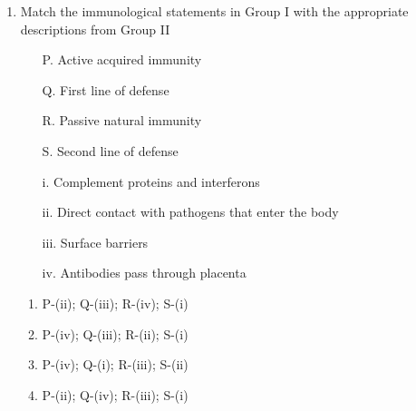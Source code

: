 \documentclass[journal,12pt,onecolumn]{IEEEtran}
\begin{document}
\begin{enumerate}
    \item \begin{minipage}{0.45\textwidth}
    Match the immunological statements in Group I with the appropriate descriptions from Group II
    \begin{itemize}
        \item[P.] Active acquired immunity
        \item[Q.] First line of defense
        \item[R.] Passive natural immunity
        \item[S.] Second line of defense
    \end{itemize}
    \end{minipage}
    \begin{minipage}{0.45\textwidth}
    \begin{itemize}
        \item[i.] Complement proteins and interferons
        \item[ii.] Direct contact with pathogens that enter the body
        \item[iii.] Surface barriers
        \item[iv.] Antibodies pass through placenta
    \end{itemize}
    \end{minipage}
    \begin{enumerate}
        \item P-(ii); Q-(iii); R-(iv); S-(i)
        \item P-(iv); Q-(iii); R-(ii); S-(i)
        \item P-(iv); Q-(i); R-(iii); S-(ii)
        \item P-(ii); Q-(iv); R-(iii); S-(i)
    \end{enumerate}


\end{enumerate}
\end{document}

